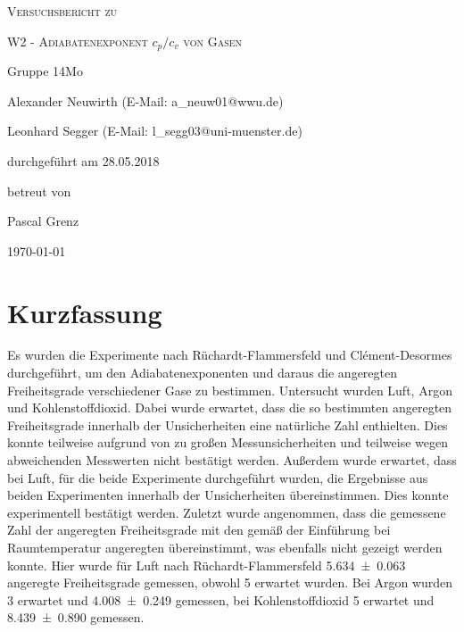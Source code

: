 \documentclass[
	a4paper,
	12pt,
	pagesize,
	ngerman
]{scrartcl}
\begin{document}
	
	\begin{titlepage}
		\centering
		{\scshape\LARGE Versuchsbericht zu \par}
		\vspace{1cm}
		{\scshape\huge W2 - Adiabatenexponent $c_p/c_v$ von Gasen \par} %
		\vspace{2.5cm}
		{\LARGE Gruppe 14Mo \par}
		\vspace{0.5cm}
		
		{\large Alexander Neuwirth (E-Mail: a\_neuw01@wwu.de) \par}
		{\large Leonhard Segger (E-Mail: l\_segg03@uni-muenster.de) \par}
		\vfill
		
		durchgeführt am 28.05.2018\par
		betreut von\par
		{\large Pascal Grenz}
		
		\vfill
		
		{\large \today\par}
	\end{titlepage}
	\tableofcontents
	\newpage

	\section{Kurzfassung}
	Es wurden die Experimente nach Rüchardt-Flammersfeld und Clément-Desormes durchgeführt, um den Adiabatenexponenten und daraus die angeregten Freiheitsgrade verschiedener Gase zu bestimmen.
	Untersucht wurden Luft, Argon und Kohlenstoffdioxid.
	Dabei wurde erwartet, dass die so bestimmten angeregten Freiheitsgrade innerhalb der Unsicherheiten eine natürliche Zahl enthielten.
	Dies konnte teilweise aufgrund von zu großen Messunsicherheiten und teilweise wegen abweichenden Messwerten nicht bestätigt werden.
	Außerdem wurde erwartet, dass bei Luft, für die beide Experimente durchgeführt wurden, die Ergebnisse aus beiden Experimenten innerhalb der Unsicherheiten übereinstimmen.
	Dies konnte experimentell bestätigt werden.
	Zuletzt wurde angenommen, dass die gemessene Zahl der angeregten Freiheitsgrade mit den gemäß der Einführung bei Raumtemperatur angeregten übereinstimmt, was ebenfalls nicht gezeigt werden konnte.
	Hier wurde für Luft nach Rüchardt-Flammersfeld \SI{5,634\pm 0,063}{} angeregte Freiheitsgrade gemessen, obwohl 5 erwartet wurden.
	Bei Argon wurden 3 erwartet und \SI{4,008 \pm 0,249}{} gemessen, bei Kohlenstoffdioxid 5 erwartet und \SI{8,439\pm 0,890}{} gemessen. %
	
\end{document}
